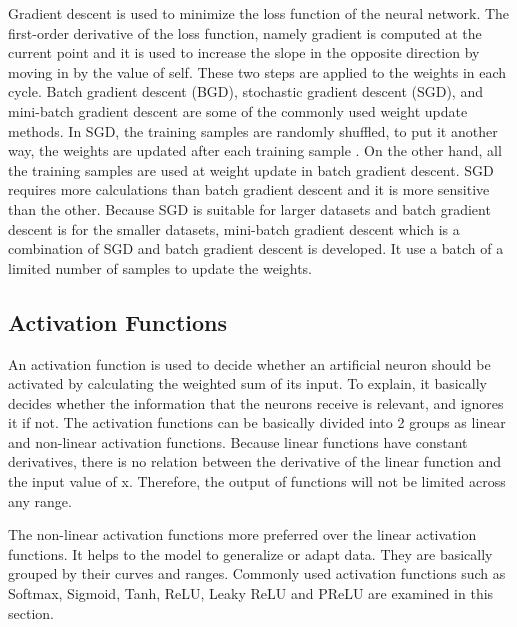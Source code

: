         Gradient descent is used to minimize the loss function of the neural network.
        The first-order derivative of the loss function, namely gradient is computed at the current point and it is used to increase the slope in the opposite direction by moving in by the value of self.
        These two steps are applied to the weights in each cycle.
        Batch gradient descent (BGD), stochastic gradient descent (SGD), and mini-batch gradient descent are some of the commonly used weight update methods.
        In SGD, the training samples are randomly shuffled, to put it another way, the weights are updated after each training sample \cite{bottou2010large}.
        On the other hand, all the training samples are used at weight update in batch gradient descent.
        SGD requires more calculations than batch gradient descent and it is more sensitive than the other.
        Because SGD is suitable for larger datasets and batch gradient descent is for the smaller datasets, mini-batch gradient descent which is a combination of SGD and batch gradient descent is developed.
        It use a batch of a limited number of samples to update the weights.

    \subsection{Activation Functions}

        An activation function is used to decide whether an artificial neuron should be activated by calculating the weighted sum of its input.
        To explain, it basically decides whether the information that the neurons receive is relevant, and ignores it if not.
        The activation functions can be basically divided into 2 groups as linear and non-linear activation functions.
        Because linear functions have constant derivatives, there is no relation between the derivative of the linear function and the input value of x.
        Therefore, the output of functions will not be limited across any range.

        

        The non-linear activation functions more preferred over the linear activation functions.
        It helps to the model to generalize or adapt data. They are basically grouped by their curves and ranges.
        Commonly used activation functions such as Softmax, Sigmoid, Tanh, ReLU, Leaky ReLU and PReLU are examined in this section.

